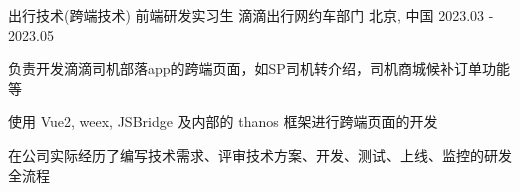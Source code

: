 

\begin{cventries}

    \cventry
    {出行技术(跨端技术) \hspace{1mm} 前端研发实习生} %
    {滴滴出行\hspace{1mm}网约车部门} %
    {北京, 中国} %
    {2023.03 - 2023.05} %
    {
        \begin{cvitems} %
            \item {负责开发滴滴司机部落app的跨端页面，如SP司机转介绍，司机商城候补订单功能等}
            \item {使用 Vue2, weex, JSBridge 及内部的 thanos 框架进行跨端页面的开发}
            \item {在公司实际经历了编写技术需求、评审技术方案、开发、测试、上线、监控的研发全流程}
        \end{cvitems}
    }

\end{cventries}
